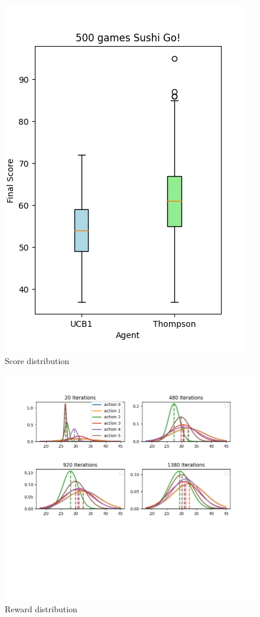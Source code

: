 \documentclass[conference]{IEEEtran}
\begin{document}
\begin{figure}[H]
\includegraphics[width=\linewidth]{sushigo-distro.png}
\caption{Score distribution}
\label{fig:distro1}
\end{figure}

\begin{figure}[H]
\includegraphics[width=\linewidth]{sushigo-distro2.png}
\caption{Reward distribution}
\label{fig:distro2}
\end{figure}
\end{document}

